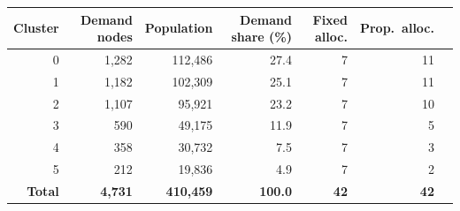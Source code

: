 \begin{tabular}{rrrrrrr}
\toprule
\textbf{Cluster}
  & \textbf{Demand nodes}
  & \textbf{Population}
  & \textbf{Demand share (\%)}
  & \textbf{Fixed alloc.}
  & \textbf{Prop.\ alloc.} \\
\midrule
0 & 1{,}282 & 112{,}486 & 27.4 & 7 & 11 \\
1 & 1{,}182 & 102{,}309 & 25.1 & 7 & 11 \\
2 & 1{,}107 &  95{,}921 & 23.2 & 7 & 10 \\
3 &   590 &  49{,}175 & 11.9 & 7 &  5 \\
4 &   358 &  30{,}732 &  7.5 & 7 &  3 \\
5 &   212 &  19{,}836 &  4.9 & 7 &  2 \\
\midrule
\textbf{Total} & \textbf{4{,}731} & \textbf{410{,}459} & \textbf{100.0}
  & \textbf{42} & \textbf{42} \\
\bottomrule
\end{tabular}

